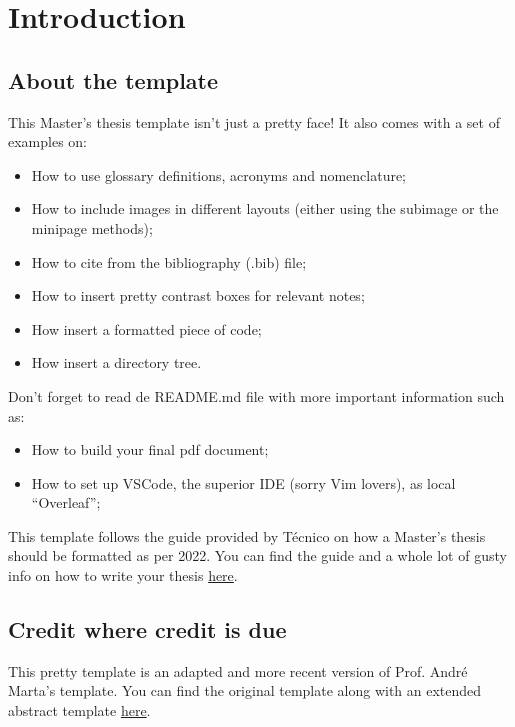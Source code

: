 \chapter{Introduction}
\label{chapter:introduction}

\section{About the template}

This Master's thesis template isn't just a pretty face! It also comes with a set of examples on:

\begin{itemize}
    \item How to use glossary definitions, acronyms and nomenclature;
    \item How to include images in different layouts (either using the subimage or the minipage methods);
    \item How to cite from the bibliography (.bib) file;
    \item How to insert pretty contrast boxes for relevant notes;
    \item How insert a formatted piece of code;
    \item How insert a directory tree.
\end{itemize}

Don't forget to read de README.md file with more important information such as:

\begin{itemize}
    \item How to build your final pdf document;
    \item How to set up VSCode, the superior IDE (sorry Vim lovers), as local ``Overleaf'';
\end{itemize}

This template follows the guide provided by Técnico on how a Master's thesis should be formatted as per 2022. You can find the guide and a whole lot of gusty info on how to write your thesis \href{https://tecnico.ulisboa.pt/en/education/study-at-tecnico/academic-information/masters-dissertation/}{here}.

\section{Credit where credit is due}

This pretty template is an adapted and more recent version of Prof. André Marta's template. You can find the original template along with an extended abstract template \href{https://fenix.tecnico.ulisboa.pt/homepage/ist31052/documentos-para-elaboracao-da-tese}{here}.

